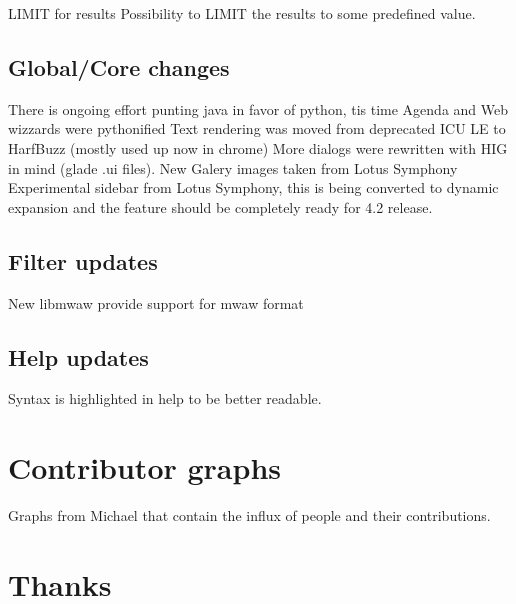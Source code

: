 \documentclass{beamer}
\begin{document}
\begin{frame}{LIMIT for results}
Possibility to LIMIT the results to some predefined value.
\end{frame}

\subsection{Global/Core changes}

\begin{frame}
There is ongoing effort punting java in favor of python, tis time Agenda and Web wizzards were pythonified
Text rendering was moved from deprecated ICU LE to HarfBuzz (mostly used up now in chrome)
More dialogs were rewritten with HIG in mind (glade .ui files).
New Galery images taken from Lotus Symphony
Experimental sidebar from Lotus Symphony, this is being converted to dynamic expansion and the feature should be completely ready for 4.2 release.
\end{frame}

\subsection{Filter updates}

\begin{frame}
New libmwaw provide support for mwaw format
\end{frame}

\subsection{Help updates}

\begin{frame}
Syntax is highlighted in help to be better readable.
\end{frame}

\section{Contributor graphs}

\begin{frame}
Graphs from Michael that contain the influx of people and their contributions.
\end{frame}

\section{Thanks}
\end{document}
